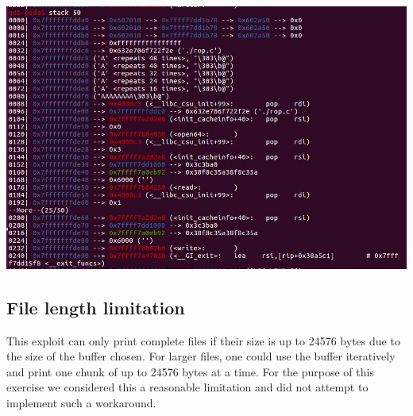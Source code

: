 \documentclass[12pt]{article}
\begin{document}
\begin{center}
    \includegraphics[scale=0.8]{ex3-stack.jpg}
\end{center}

\subsection{File length limitation}

This exploit can only print complete files if their size is up to 24576 bytes due to the size of the buffer chosen. For larger files, one could use the buffer iteratively and print one chunk of up to 24576 bytes at a time. For the purpose of this exercise we considered this a reasonable limitation and did not attempt to implement such a workaround.
\end{document}
